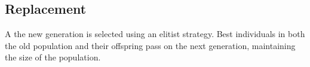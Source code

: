 \subsection{Replacement}\label{ga:rep}

A the new generation is selected using an elitist strategy. Best individuals in both the old population and their offspring pass on the next generation, maintaining the size of the population.


